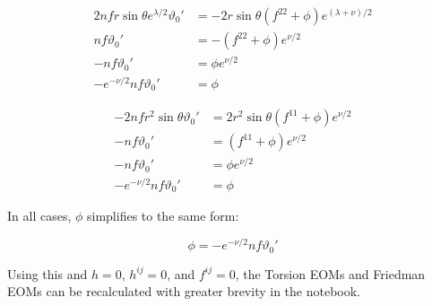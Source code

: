 \documentclass[12pt]{article}
\begin{document}
\begin{align}
2nf r \sin\theta e^{\lambda/2} \vartheta_0' &= -2r \sin\theta (f^{22} + \phi) e^{(\lambda + \nu)/2} \nonumber \\
nf \vartheta_0' &= -(f^{22} + \phi) e^{\nu/2} \nonumber \\
-nf \vartheta_0' &= \phi e^{\nu/2} \nonumber \\
-e^{-\nu/2} nf \vartheta_0' &= \phi
\end{align}

\begin{align}
-2 n f r^2 \sin\theta \vartheta_0' &= 2 r^2 \sin\theta (f^{11} + \phi) e^{\nu/2} \nonumber \\
-n f \vartheta_0' &= (f^{11} + \phi) e^{\nu/2} \nonumber \\
-n f \vartheta_0' &= \phi e^{\nu/2} \nonumber \\
-e^{-\nu/2}n f \vartheta_0' &= \phi
\end{align}

In all cases, $\phi$ simplifies to the same form:

\begin{equation}
  \phi = -e^{-\nu/2}n f \vartheta_0'
\end{equation}

Using this and $h=0$, $h^{ij} = 0$, and $f^{ij} = 0$, the Torsion EOMs and Friedman EOMs can be recalculated with greater brevity in the notebook.
\end{document}
